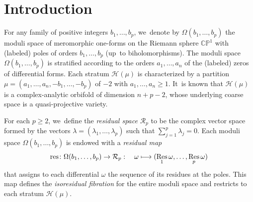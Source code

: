 \documentclass[JEP,XML,SOM,Unicode,NoFloatCountersInSection,published]{cedram}
\newcommand\mto{\mathchoice{\longmapsto}{\mapsto}{\mapsto}{\mapsto}}
\DeclareMathOperator{\res}{res}
\DeclareMathOperator\Res{Res}
\theoremstyle{definition}
\begin{document}
\maketitle
\tableofcontents
\mainmatter

\section{Introduction}

For any family of positive integers $b_{1},\dots,b_{p}$, we~denote by $\Omega(b_{1},\dots,b_{p})$ the moduli space of meromorphic one-forms on the Riemann sphere $\mathbb{CP}^{1}$ with (labeled) poles of orders $b_{1},\dots,b_{p}$ (up~to biholomorphisms). The moduli space $\Omega(b_{1},\dots,b_{p})$ is stratified according to the orders $a_{1},\dots,a_{n}$ of the (labeled) zeros of differential forms.
Each stratum $\mathcal{H}(\mu)$ is characterized by a partition $\mu=(a_{1},\dots,a_{n},-b_{1},\dots,-b_{p})$ of $-2$ with $a_{1},\dots,a_{n} \geq 1$. It~is known that $\mathcal{H}(\mu)$ is a complex-analytic orbifold of dimension $n+p-2$, whose underlying coarse space is a quasi-projective variety.

For each $p \geq 2$, we~define the \textit{residual space} $\mathcal{R}_{p}$ to be the complex vector space formed by the vectors $\lambda = (\lambda_{1},\dots,\lambda_{p})$ such that $\sum_{j=1}^{p} \lambda_{j} = 0$. Each moduli space $\Omega(b_{1},\dots,b_{p})$ is endowed with a \textit{residual map}
\[
\res\colon \Omega(b_{1},\dots,b_{p}) \to \mathcal{R}_{p}: \quad\omega \mto (\Res_{1}\omega,\dots,\Res_{p}\omega)
\]
that assigns to each differential $\omega$ the sequence of its residues at the poles. This map defines the \textit{isoresidual fibration} for the entire moduli space and restricts to each stratum $\mathcal{H}(\mu)$.
\end{document}
